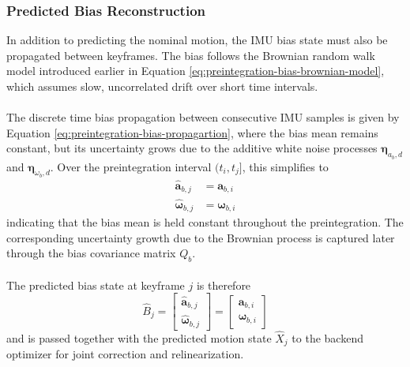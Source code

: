 \subsubsection{Predicted Bias Reconstruction}
In addition to predicting the nominal motion, the IMU bias state must also be propagated between keyframes. The bias follows the Brownian random walk model introduced earlier in Equation \ref{eq:preintegration-bias-brownian-model}, which assumes slow, uncorrelated drift over short time intervals.  
\\ \\
The discrete time bias propagation between consecutive IMU samples is given by Equation \ref{eq:preintegration-bias-propagartion}, where the bias mean remains constant, but its uncertainty grows due to the additive white noise processes $\boldsymbol{\eta}_{a_b,d}$ and $\boldsymbol{\eta}_{\omega_b,d}$. Over the preintegration interval $(t_i, t_j]$, this simplifies to
$$
    \begin{aligned}
        \hat{\mathbf{a}}_{b,j} &= \mathbf{a}_{b,i} \\
        \hat{\boldsymbol{\omega}}_{b,j} &= \boldsymbol{\omega}_{b,i}
    \end{aligned}
$$
indicating that the bias mean is held constant throughout the preintegration. The corresponding uncertainty growth due to the Brownian process is captured later through the bias covariance matrix $Q_b$.  
\\ \\
The predicted bias state at keyframe $j$ is therefore
$$
    \hat{B}_j = 
    \begin{bmatrix}
        \hat{\mathbf{a}}_{b,j} \\
        \hat{\boldsymbol{\omega}}_{b,j}
    \end{bmatrix}
    =
    \begin{bmatrix}
        \mathbf{a}_{b,i} \\
        \boldsymbol{\omega}_{b,i}
    \end{bmatrix}
$$
and is passed together with the predicted motion state $\hat{X}_j$ to the backend optimizer for joint correction and relinearization.



